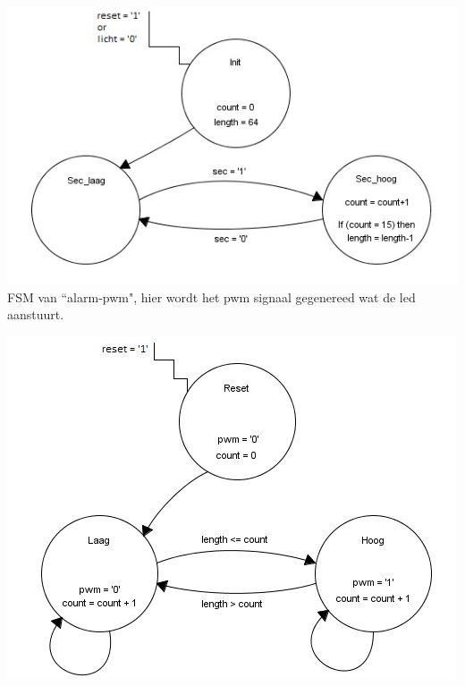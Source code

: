 \includegraphics[width=\textwidth,height=\textheight,keepaspectratio]{FSM/alarm-count-fsm.jpg}
\newpage
FSM van ``alarm-pwm", hier wordt het pwm signaal gegenereed wat de led aanstuurt.

\includegraphics[width=\textwidth,height=\textheight,keepaspectratio]{FSM/alarm-pwm-fsm.jpg}
